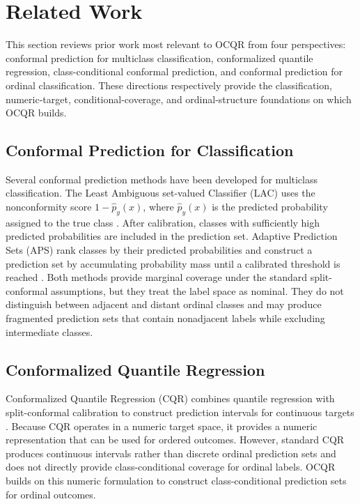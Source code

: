 \documentclass[conference]{IEEEtran}
\begin{document}
\section{Related Work}
\label{relatedwork}
This section reviews prior work most relevant to OCQR from four perspectives: conformal prediction for multiclass classification, conformalized quantile regression, class-conditional conformal prediction, and conformal prediction for ordinal classification. These directions respectively provide the classification, numeric-target, conditional-coverage, and ordinal-structure foundations on which OCQR builds.

\subsection{Conformal Prediction for Classification}
\label{subsec:cp_classification}

Several conformal prediction methods have been developed for multiclass classification. The Least Ambiguous set-valued Classifier (LAC) uses the nonconformity score \(1-\widehat{p}_y(x)\), where \(\widehat{p}_y(x)\) is the predicted probability assigned to the true class \cite{sadinle2019least}. After calibration, classes with sufficiently high predicted probabilities are included in the prediction set. Adaptive Prediction Sets (APS) rank classes by their predicted probabilities and construct a prediction set by accumulating probability mass until a calibrated threshold is reached \cite{angelopoulos2020uncertainty,romano2020classification}. Both methods provide marginal coverage under the standard split-conformal assumptions, but they treat the label space as nominal. They do not distinguish between adjacent and distant ordinal classes and may produce fragmented prediction sets that contain nonadjacent labels while excluding intermediate classes.

\subsection{Conformalized Quantile Regression}
\label{subsec:cqr}
Conformalized Quantile Regression (CQR) combines quantile regression with split-conformal calibration to construct prediction intervals for continuous targets \cite{romano2019cqr}. Because CQR operates in a numeric target space, it provides a numeric representation that can be used for ordered outcomes. However, standard CQR produces continuous intervals rather than discrete ordinal prediction sets and does not directly provide class-conditional coverage for ordinal labels. OCQR builds on this numeric formulation to construct class-conditional prediction sets for ordinal outcomes.
\end{document}
